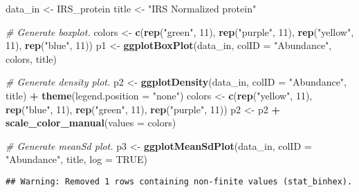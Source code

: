 \documentclass[]{article}
\newenvironment{Shaded}{\begin{snugshade}}{\end{snugshade}}
\newcommand{\KeywordTok}[1]{\textcolor[rgb]{0.13,0.29,0.53}{\textbf{#1}}}
\newcommand{\DataTypeTok}[1]{\textcolor[rgb]{0.13,0.29,0.53}{#1}}
\newcommand{\DecValTok}[1]{\textcolor[rgb]{0.00,0.00,0.81}{#1}}
\newcommand{\StringTok}[1]{\textcolor[rgb]{0.31,0.60,0.02}{#1}}
\newcommand{\CommentTok}[1]{\textcolor[rgb]{0.56,0.35,0.01}{\textit{#1}}}
\newcommand{\OtherTok}[1]{\textcolor[rgb]{0.56,0.35,0.01}{#1}}
\newcommand{\OperatorTok}[1]{\textcolor[rgb]{0.81,0.36,0.00}{\textbf{#1}}}
\newcommand{\NormalTok}[1]{#1}
\begin{document}
\begin{Shaded}
\begin{Highlighting}[]
\NormalTok{data_in <-}\StringTok{ }\NormalTok{IRS_protein}
\NormalTok{title <-}\StringTok{ "IRS Normalized protein"}

\CommentTok{# Generate boxplot.}
\NormalTok{colors <-}\StringTok{ }\KeywordTok{c}\NormalTok{(}\KeywordTok{rep}\NormalTok{(}\StringTok{"green"}\NormalTok{, }\DecValTok{11}\NormalTok{), }\KeywordTok{rep}\NormalTok{(}\StringTok{"purple"}\NormalTok{, }\DecValTok{11}\NormalTok{), }
            \KeywordTok{rep}\NormalTok{(}\StringTok{"yellow"}\NormalTok{, }\DecValTok{11}\NormalTok{), }\KeywordTok{rep}\NormalTok{(}\StringTok{"blue"}\NormalTok{, }\DecValTok{11}\NormalTok{))}
\NormalTok{p1 <-}\StringTok{ }\KeywordTok{ggplotBoxPlot}\NormalTok{(data_in, }\DataTypeTok{colID =} \StringTok{"Abundance"}\NormalTok{, colors, title)}

\CommentTok{# Generate density plot.}
\NormalTok{p2 <-}\StringTok{ }\KeywordTok{ggplotDensity}\NormalTok{(data_in, }\DataTypeTok{colID =} \StringTok{"Abundance"}\NormalTok{, title) }\OperatorTok{+}\StringTok{ }
\StringTok{  }\KeywordTok{theme}\NormalTok{(}\DataTypeTok{legend.position =} \StringTok{"none"}\NormalTok{)}
\NormalTok{colors <-}\StringTok{ }\KeywordTok{c}\NormalTok{(}\KeywordTok{rep}\NormalTok{(}\StringTok{"yellow"}\NormalTok{, }\DecValTok{11}\NormalTok{), }\KeywordTok{rep}\NormalTok{(}\StringTok{"blue"}\NormalTok{, }\DecValTok{11}\NormalTok{), }
            \KeywordTok{rep}\NormalTok{(}\StringTok{"green"}\NormalTok{, }\DecValTok{11}\NormalTok{), }\KeywordTok{rep}\NormalTok{(}\StringTok{"purple"}\NormalTok{, }\DecValTok{11}\NormalTok{))}
\NormalTok{p2 <-}\StringTok{ }\NormalTok{p2 }\OperatorTok{+}\StringTok{ }\KeywordTok{scale_color_manual}\NormalTok{(}\DataTypeTok{values =}\NormalTok{ colors)}

\CommentTok{# Generate meanSd plot.}
\NormalTok{p3 <-}\StringTok{ }\KeywordTok{ggplotMeanSdPlot}\NormalTok{(data_in, }\DataTypeTok{colID =} \StringTok{"Abundance"}\NormalTok{, title, }\DataTypeTok{log =} \OtherTok{TRUE}\NormalTok{)}
\end{Highlighting}
\end{Shaded}

\begin{verbatim}
## Warning: Removed 1 rows containing non-finite values (stat_binhex).
\end{verbatim}
\end{document}

